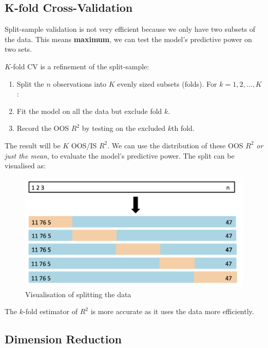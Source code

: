 \documentclass[11pt]{article}
\begin{document}
\subsection{K-fold Cross-Validation}

Split-sample validation is not very efficient because we only have two subsets of the data. This means \textbf{maximum}, we can test the model's predictive power on two sets.

$K$-fold CV is a refinement of the split-sample:

\begin{procedure}
    \begin{enumerate}
        \item Split the $n$ observations into $K$ evenly sized subsets (folds). For $k = 1,2,\ldots, K$:
        \item Fit the model on all the data but exclude fold $k$.
        \item Record the OOS $R^2$ by testing on the excluded $k$th fold.
    \end{enumerate}
\end{procedure}

The result will be $K$ OOS/IS $R^2$. We can use the distribution of these OOS $R^2$ \textit{or just the mean}, to evaluate the model's predictive power. The split can be visualised as:

\begin{figure}[h]
    \centering
    \includegraphics[width = \textwidth]{pic/kfold.png}
    \caption{Visualisation of splitting the data}
    \label{fig:kfold split}
\end{figure}

The $k$-fold estimator of $R^2$ is more accurate as it uses the data more efficiently.

\subsection{Dimension Reduction}
\end{document}
